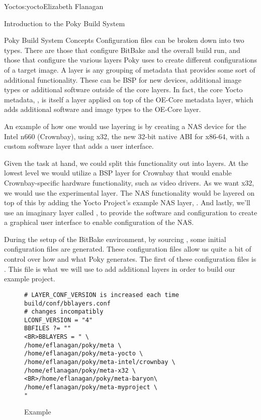 \begin{aosachapter}{Yocto}{s:yocto}{Elizabeth Flanagan}
\begin{aosasect1}{Introduction to the Poky Build System}
\begin{aosasect2}{Poky Build System Concepts}
Configuration files can be broken down into two types. There are those that
configure BitBake and the overall build run, and those that configure
the various layers Poky uses to create different configurations of a
target image. A layer is any grouping of metadata that provides some
sort of additional functionality. These can be BSP for new devices,
additional image types or additional software outside of the core
layers. In fact, the core Yocto metadata, , is itself a
layer applied on top of the OE-Core metadata layer,  which adds
additional software and image types to the OE-Core layer.

An example of how one would use layering is by creating a NAS device
for the Intel n660 (Crownbay), using x32, the new 32-bit native
ABI for x86-64, with a custom software layer that adds a user
interface.

Given the task at hand, we could split this functionality out into
layers. At the lowest level we would utilize a BSP layer for Crownbay
that would enable Crownbay-specific hardware functionality, such as
video drivers. As we want x32, we would use the experimental 
layer. The NAS functionality would be layered on top of this by adding
the Yocto Project's example NAS layer, . And lastly, we'll
use an imaginary layer called , to provide the software
and configuration to create a graphical user interface to enable
configuration of the NAS.


During the setup of the BitBake environment, by sourcing
, some initial configuration files are generated.
These configuration files allow us quite a bit of control over how and
what Poky generates. The first of these configuration files is
. This file is what we will use to add additional layers
in order to build our example project.

\begin{figure}
\begin{verbatim}
# LAYER_CONF_VERSION is increased each time build/conf/bblayers.conf
# changes incompatibly
LCONF_VERSION = "4"
BBFILES ?= ""
<BR>BBLAYERS = " \
/home/eflanagan/poky/meta \
/home/eflanagan/poky/meta-yocto \
/home/eflanagan/poky/meta-intel/crownbay \
/home/eflanagan/poky/meta-x32 \<BR>/home/eflanagan/poky/meta-baryon\
/home/eflanagan/poky/meta-myproject \
"
\end{verbatim}
\caption{Example }
\label{fig.yocto.bblayers}
\end{figure}


\end{aosasect2}
\end{aosasect1}
\end{aosachapter}
